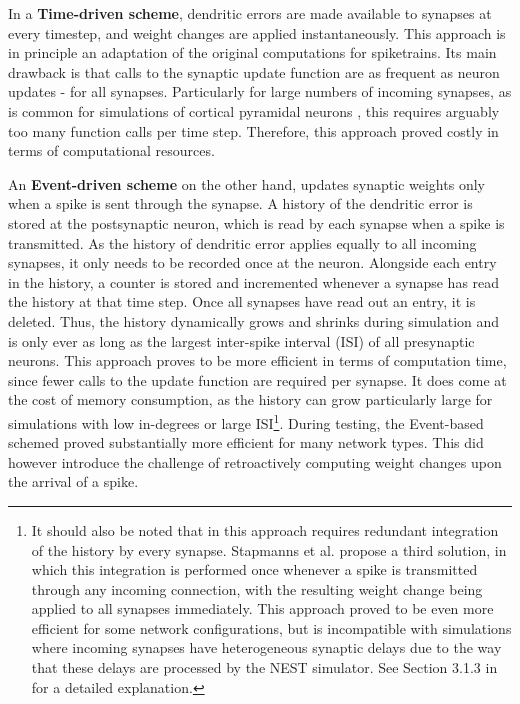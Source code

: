 In a \textbf{Time-driven scheme}, dendritic errors are made available to synapses at every timestep, and weight changes
are applied instantaneously. This approach is in principle an adaptation of the original computations for spiketrains.
Its main drawback is that calls to the synaptic update function are as frequent as neuron updates - for all synapses.
Particularly for large numbers of incoming synapses, as is common for simulations of cortical pyramidal neurons
\citep{potjans2014cell,vezoli2004quantitative}, this requires arguably too many function calls per time step. Therefore,
this approach proved costly in terms of computational resources.

An \textbf{Event-driven scheme} on the other hand, updates synaptic weights only when a spike is sent through the
synapse. A history of the dendritic error is stored at the postsynaptic neuron, which is read by each synapse when a
spike is transmitted. As the history of dendritic error applies equally to all incoming synapses, it only needs to be
recorded once at the neuron. Alongside each entry in the history, a counter is stored and incremented whenever a synapse
has read the history at that time step. Once all synapses have read out an entry, it is deleted. Thus, the history
dynamically grows and shrinks during simulation and is only ever as long as the largest inter-spike interval (ISI) of
all presynaptic neurons. This approach proves to be more efficient in terms of computation time, since fewer calls to
the update function are required per synapse. It does come at the cost of memory consumption, as the history can grow
particularly large for simulations with low in-degrees or large ISI\footnote{It should also be noted that in this
approach requires redundant integration of the history by every synapse. Stapmanns et al. propose a third solution, in
which this integration is performed once whenever a spike is transmitted through any incoming connection, with the
resulting weight change being applied to all synapses immediately. This approach proved to be even more efficient for
some network configurations, but is incompatible with simulations where incoming synapses have heterogeneous synaptic
delays due to the way that these delays are processed by the NEST simulator. See Section 3.1.3 in \citep{Stapmanns2021}
for a detailed explanation.}. During testing, the Event-based schemed proved substantially more efficient for many
network types. This did however introduce the challenge of retroactively computing weight changes  upon the arrival of a
spike. \newline


